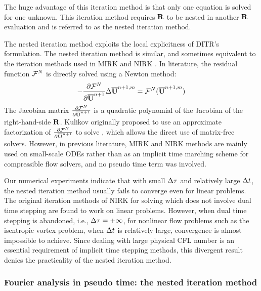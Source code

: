 The huge advantage of this iteration method is 
that only one equation is solved for one unknown.
This iteration method requires $\mathbf{R}$ to be nested in another $\mathbf{R}$ evaluation and
is referred to as the nested iteration method.

The nested iteration method exploits the
local explicitness of DITR's formulation.
The nested iteration method is similar, and sometimes equivalent to
the iteration methods used in MIRK \cite{cash1975classMIRKOrig,cash1977clasMIRK1,cash1982monoMIRK2}
and NIRK \cite{kulikov2006familyNIRKOrig,kulikov2009adaptive,kulikov2007asymptotic}.
In literature, the residual function $\mathcal{F}^N$ is directly
solved using a Newton method:
\begin{equation}
    -\partialderivative{\FF^N}{\uu^{n+1}}
    \inc\uu^{n+1,m} = \FF^N(\uu^{n+1,m})
    \label{eq:abstractNewtonNestedNoTau}
\end{equation}
The Jacobian matrix $\partialderivative{\FF^N}{\uu^{n+1}}$
is a quadratic polynomial of the Jacobian of the right-hand-side $\mathbf{R}$.
Kulikov originally proposed to use an approximate factorization \cite{kulikov2006familyNIRKOrig}
of $\partialderivative{\FF^N}{\uu^{n+1}}$ to solve ,
which allows the direct use of matrix-free solvers.
However, in previous literature, 
MIRK and NIRK methods are mainly used on small-scale
ODEs rather than as an implicit time marching scheme 
for compressible flow solvers,
and no pseudo time term was involved.

Our numerical experiments indicate that with small ${\Delta}\tau$
and relatively large ${\Delta} t$,
the nested iteration method 
usually fails to converge even for linear problems.
The original iteration methods of NIRK for solving
which does not involve dual time stepping
are found to work on linear problems.
However,  when dual time stepping is abandoned, i.e., ${\Delta} \tau=+\infty$,
for nonlinear flow problems such as the isentropic vortex problem,
when ${\Delta} t$ is relatively large, convergence is almost impossible
to achieve.
Since dealing with large physical CFL number
is an essential requirement of implicit
time stepping methods,
this divergent result denies the practicality of the
nested iteration method.






\subsubsection{Fourier analysis in pseudo time: the nested iteration method}

